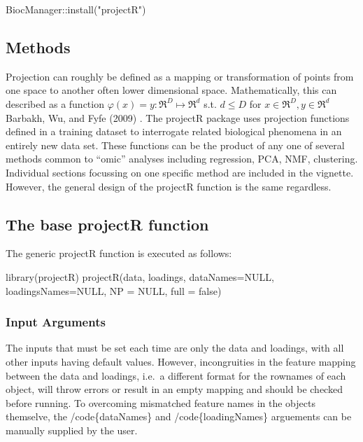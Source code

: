 \documentclass[]{article}
\renewenvironment{verbatim}{\color{codecolor}\begin{myshaded}\begin{oldverbatim}}{\end{oldverbatim}\end{myshaded}}
\begin{document}
\begin{verbatim}
BiocManager::install("projectR")
\end{verbatim}

\hypertarget{methods}{%
\subsection{Methods}\label{methods}}

Projection can roughly be defined as a mapping or transformation of points from one space to another often lower dimensional space. Mathematically, this can described as a function \(\varphi(x)=y : \Re^{D} \mapsto \Re^{d}\) s.t. \(d \leq D\) for \(x \in \Re^{D}, y \in \Re^{d}\) Barbakh, Wu, and Fyfe (2009) . The projectR package uses projection functions defined in a training dataset to interrogate related biological phenomena in an entirely new data set. These functions can be the product of any one of several methods common to ``omic'' analyses including regression, PCA, NMF, clustering. Individual sections focussing on one specific method are included in the vignette. However, the general design of the projectR function is the same regardless.

\hypertarget{the-base-projectr-function}{%
\subsection{The base projectR function}\label{the-base-projectr-function}}

The generic projectR function is executed as follows:

\begin{verbatim}
library(projectR)
projectR(data, loadings, dataNames=NULL, loadingsNames=NULL, NP = NULL, full = false)
\end{verbatim}

\hypertarget{input-arguments}{%
\subsubsection{Input Arguments}\label{input-arguments}}

The inputs that must be set each time are only the data and loadings, with all other inputs having default values. However, incongruities in the feature mapping between the data and loadings, i.e.~a different format for the rownames of each object, will throw errors or result in an empty mapping and should be checked before running. To overcoming mismatched feature names in the objects themselve, the /code\{dataNames\} and /code\{loadingNames\} arguements can be manually supplied by the user.
\end{document}
